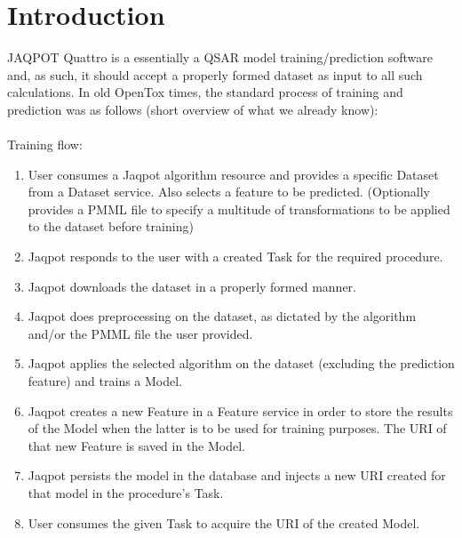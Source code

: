 \section{Introduction}
JAQPOT Quattro is a essentially a QSAR model training/prediction software and, 
as such, it should accept a properly formed dataset as input to all 
such calculations. In old OpenTox times, the standard process of training 
and prediction was as follows (short overview of what we already know):\\\\

\noindent Training flow:
\begin{enumerate}
 \item 	User consumes a Jaqpot algorithm resource and provides a 
	specific Dataset from a Dataset service. Also selects a feature to be 
	predicted. (Optionally provides a PMML file to specify a multitude of 
	transformations to be applied to the dataset before training)
\item  Jaqpot responds to the user with a created Task for the required procedure.
\item   Jaqpot downloads the dataset in a properly formed manner.
 \item  Jaqpot does preprocessing on the dataset, as dictated by the algorithm and/or the PMML file the user provided.
 \item  Jaqpot applies the selected algorithm on the dataset (excluding the prediction feature) and trains a Model. 
 \item  Jaqpot creates a new Feature in a Feature service in order to store the results of the Model when the latter is to be used for training purposes. The URI of that new Feature is saved in the Model.
 \item  Jaqpot persists the model in the database and injects a new URI created for that model in the procedure’s Task.
 \item  User consumes the given Task to acquire the URI of the created Model.
\end{enumerate}

 
 
